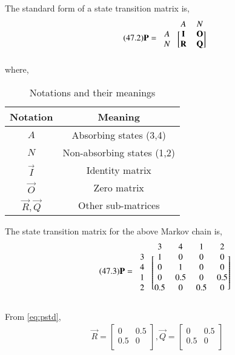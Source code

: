 \documentclass[journal,12pt,twocolumn]{IEEEtran}
\begin{document}
\newpage
\begin{definition}
The standard form of a state transition matrix is,
\begin{align}
\tag{47.2}
\label{eq:std}
   \vec{P}=\begin{blockarray}{ccc}
&A & N \\
\begin{block}{c[cc]}
  A & \vec{I} & \vec{O}  \\
  N & \vec{R} & \vec{Q} \\
\end{block}
\end{blockarray}
\end{align}
where,
\begin{table}[h!]
\centering
\caption{Notations and their meanings}
\label{table:3}
\begin{tabular}{|c|c|}
    \hline
    Notation & Meaning \\
    \hline
    $A$ & Absorbing states (3,4)\\[1ex]
    \hline
    $N$ & Non-absorbing states (1,2)\\[1ex]
    \hline
    $\vec{I}$ & Identity matrix\\[1ex]
    \hline
    $\vec{O}$ & Zero matrix\\[1ex]
    \hline
    $\vec{R},\vec{Q}$ & Other sub-matrices\\[1ex]
    \hline
\end{tabular}
\end{table}
\end{definition}
\begin{corollary}
The state transition matrix for the above Markov chain is, 
\begin{align}
\tag{47.3}
\label{eq:pstd}
    \vec{P}=\begin{blockarray}{cccccc}
& 3 & 4 & 1 & 2 \\
\begin{block}{c[ccccc]}
  3 & 1 & 0 & 0 & 0 \\
  4 & 0 & 1 & 0 & 0 \\
  1 & 0 & 0.5 & 0 & 0.5  \\
  2 & 0.5 & 0 & 0.5 & 0  \\
\end{block}
\end{blockarray}
\end{align}
\end{corollary}
From \eqref{eq:pstd},
\begin{align}
\tag{47.4}
\label{eq:r,q}
    \vec{R}=\begin{bmatrix}
    0 & 0.5\\
    0.5 & 0\\
    \end{bmatrix},
    \vec{Q}=\begin{bmatrix}
    0 & 0.5 \\
    0.5 & 0 \\
    \end{bmatrix}
\end{align}
\end{document}
